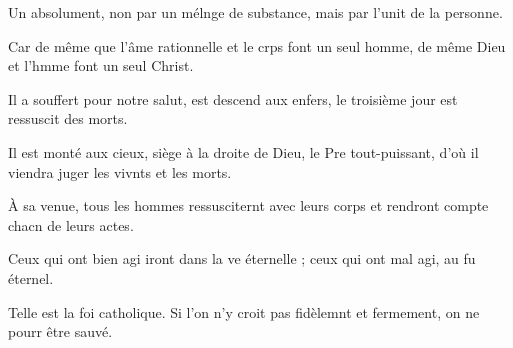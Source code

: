 \item Un absolument, non par un mélnge de substance,\psstar{} mais par l’unit de la personne.
\item Car de même que l’âme rationnelle et le crps font un seul homme,\psstar{} de même Dieu et l’hmme font un seul Christ.
\item Il a souffert pour notre salut, est descend aux enfers,\psstar{} le troisième jour est ressuscit des morts.
\item Il est monté aux cieux, siège à la droite de Dieu, le Pre tout-puissant,\psstar{} d’où il viendra juger les vivnts et les morts.
\item À sa venue, tous les hommes ressusciternt avec leurs corps\psstar{} et rendront compte chacn de leurs actes.
\item Ceux qui ont bien agi iront dans la ve éternelle ;\psstar{} ceux qui ont mal agi, au fu éternel.
\item Telle est la foi catholique.\pscross{} Si l'on n'y croit pas fidèlemnt et fermement,\psstar{} on ne pourr être sauvé.